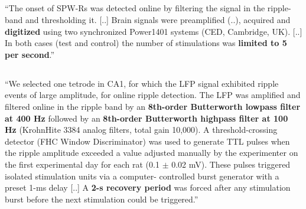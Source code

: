 \subsection{}

\begin{quotebar}
``The onset of SPW-Rs was detected online by filtering the signal in the ripple-band and thresholding it. [..] Brain signals were preamplified (..), acquired and \textbf{digitized} using two synchronized Power1401 systems (CED, Cambridge, UK). [..] In both cases (test and control) the number of stimulations was \textbf{limited to 5 per second}.'' \cite{Girardeau2009}
\end{quotebar}


\subsection{}

\begin{quotebar}
``We selected one tetrode in CA1, for which the LFP signal exhibited ripple events of large amplitude, for online ripple detection. The LFP was amplified and filtered online in the ripple band by an \textbf{8th-order Butterworth lowpass filter at 400 Hz} followed by an \textbf{8th-order Butterworth highpass filter at 100 Hz} (KrohnHite 3384 analog filters, total gain 10,000). A threshold-crossing detector (FHC Window Discriminator) was used to generate TTL pulses when the ripple amplitude exceeded a value adjusted manually by the experimenter on the first experimental day for each rat (0.1 $\pm$ 0.02 mV). These pulses triggered isolated stimulation units via a computer- controlled burst generator with a preset 1-ms delay [..] A \textbf{2-s recovery period} was forced after any stimulation burst before the next stimulation could be triggered.'' \cite{Ego-Stengel2009}
\end{quotebar}


\subsection{}

